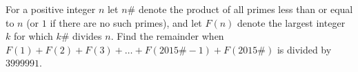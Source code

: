 For a positive integer $n$ let $n\#$ denote the product of all primes less than or equal to $n$ (or $1$ if there are no such primes), and let $F(n)$ denote the largest integer $k$ for which $k\#$ divides $n$.  Find the remainder when $F(1) + F(2) +F(3) +  \dots + F(2015\#-1) + F(2015\#)$ is divided by $3999991$.
